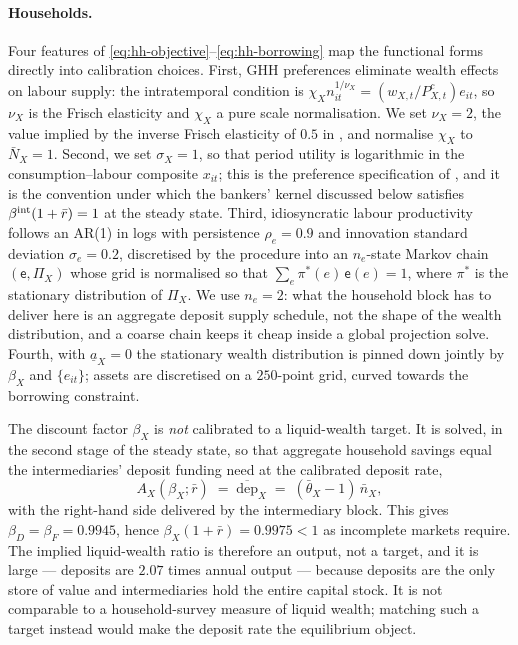 \paragraph{Households.}
Four features of \eqref{eq:hh-objective}--\eqref{eq:hh-borrowing} map the
functional forms directly into calibration choices. First, GHH preferences
eliminate wealth effects on labour supply: the intratemporal condition is
$\chi_X n_{it}^{1/\nu_X}=(w_{X,t}/P^{c}_{X,t})e_{it}$, so $\nu_X$ is the Frisch
elasticity and $\chi_X$ a pure scale normalisation. We set $\nu_X=2$, the value
implied by the inverse Frisch elasticity of $0.5$ in \citet{bocola2016pass}, and
normalise $\chi_X$ to $\bar N_X=1$. Second, we set $\sigma_X=1$, so that
period utility is logarithmic in the consumption--labour composite $x_{it}$;
this is the preference specification of \citet{bocola2016pass}, and it is the
convention under which the bankers' kernel discussed below satisfies
$\beta^{\rm int}(1+\bar r)=1$ at the steady state. Third, idiosyncratic labour productivity follows an
AR(1) in logs with persistence $\rho_e=0.9$ and innovation standard deviation
$\sigma_e=0.2$, discretised by the \citet{rouwenhorst1995} procedure into an
$n_e$-state Markov chain $(\mathsf{e},\Pi_X)$ whose grid is normalised so that
$\sum_e\pi^{\ast}(e)\,\mathsf{e}(e)=1$, where $\pi^{\ast}$ is the stationary
distribution of $\Pi_X$. We use $n_e=2$: what the household block has to deliver
here is an aggregate deposit supply schedule, not the shape of the wealth
distribution, and a coarse chain keeps it cheap inside a global projection solve.
Fourth,
with $\underline a_X=0$ the stationary wealth distribution is pinned down jointly
by $\beta_X$ and $\{e_{it}\}$; assets are discretised on a $250$-point grid,
curved towards the borrowing constraint.

The discount factor $\beta_X$ is \emph{not} calibrated to a liquid-wealth target.
It is solved, in the second stage of the steady state, so that aggregate
household savings equal the intermediaries' deposit funding need at the
calibrated deposit rate,
\begin{equation}
A_X(\beta_X;\bar r)\;=\;\overline{\mathrm{dep}}_X\;=\;(\bar\theta_X-1)\,\bar n_X ,
\label{eq:beta-clearing}
\end{equation}
with the right-hand side delivered by the intermediary block. This gives
$\beta_D=\beta_F=0.9945$, hence $\beta_X(1+\bar r)=0.9975<1$ as incomplete markets
require. The implied liquid-wealth ratio is therefore an output, not a target,
and it is large --- deposits are $2.07$ times annual output --- because deposits
are the only store of value and intermediaries hold the entire capital stock. It
is not comparable to a household-survey measure of liquid wealth; matching such a
target instead would make the deposit rate the equilibrium object.

